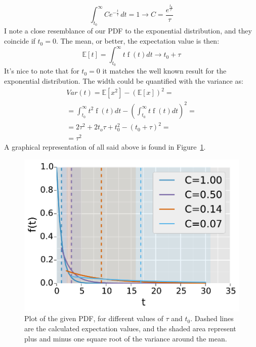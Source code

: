 \documentclass[twocolumn]{article}
\begin{document}
		\begin{equation}
			\int_{t_{{0}}}^{\infty} C e^{- \frac{t}{\tau}}\, dt = 1 \longrightarrow C =  \frac{
			e^{
			\frac{t_0}{\tau}
			}}
			{\tau}
		\end{equation}
		I note a close resemblance of our PDF to the exponential distribution, and they coincide if $t_0 = 0$. 
		The mean, or better, the expectation  value is then:
		\begin{equation}
		\mathbb{E} [t] = \int_{t_0}^{\infty} t \operatorname{f}{(t) d t } \longrightarrow  t_0 + \tau
		\end{equation}
		It's nice to note that for $t_0 = 0$ it matches the well known result for the exponential distribution.
		The width could be quantified with the variance as:
		\begin{multline}
			Var(t) = \mathbb{E}[x^2] - (\mathbb{E}[x])^2 = \\
			= 
			\int_{t_0}^{\infty} t^2 \operatorname{f}{(t) d t } 
			-(\int_{t_0}^{\infty} t \operatorname{f}{(t) d t })^2 = \\
			= 2 \tau ^ 2 + 2 t_o \tau +t_0 ^2  - ( t_0 + \tau ) ^ 2 = \\
			= \tau ^ 2
		\end{multline}
		A graphical representation of all said above is found in Figure~\ref{fig:pdf}.
		\begin{figure}[h!]
			\begin{center}
				\includegraphics[width= 0.4 \textwidth]{fig/graph.pdf}
			\end{center}
			\caption{Plot of the given PDF, for different values of $ \tau $ and $t_0 $. Dashed lines are the calculated expectation values, and the shaded area represent plus and minus one square root of the variance around the mean.}
			\label{fig:pdf}
		\end{figure}
\end{document}

